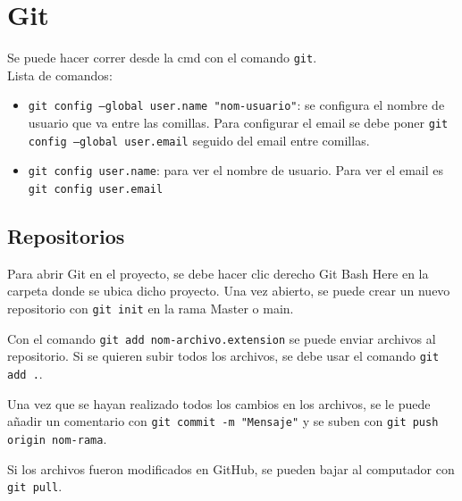 \documentclass[a4paper, 12pt]{book}
\begin{document}
\section{Git}
Se puede hacer correr desde la cmd con el comando \texttt{git}. \\
Lista de comandos:
\begin{itemize}
\item \texttt{git config --global user.name "nom-usuario"}: se configura el nombre de usuario que va entre las comillas. Para configurar el email se debe poner \texttt{git config --global user.email} seguido del email entre comillas.
\item \texttt{git config user.name}: para ver el nombre de usuario. Para ver el email es \texttt{git config user.email}
\end{itemize}
\subsection{Repositorios}
Para abrir Git en el proyecto, se debe hacer clic derecho Git Bash Here en la carpeta donde se ubica dicho proyecto. Una vez abierto, se puede crear un nuevo repositorio con \texttt{git init} en la rama Master o main.

Con el comando \texttt{git add nom-archivo.extension} se puede enviar archivos al repositorio. Si se quieren subir todos los archivos, se debe usar el comando \texttt{git add .}.

Una vez que se hayan realizado todos los cambios en los archivos, se le puede añadir un comentario con \texttt{git commit -m "Mensaje"} y se suben con \texttt{git push origin nom-rama}.

Si los archivos fueron modificados en GitHub, se pueden bajar al computador con \texttt{git pull}.
\end{document}

